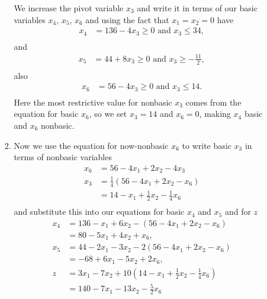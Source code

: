 \documentclass[10pt]{article}
\begin{document}
\begin{enumerate}
\begin{enumerate}
\begin{enumerate}
          We increase the pivot variable $x_3$ and write it in terms of our
          basic variables $x_4$, $x_5$, $x_6$ and using the fact that $x_1 =
          x_2 = 0$ have
          \begin{align*}
            x_4  &=  136  -  4x_3 \geq 0 \text{ and } x_3 \leq 34, \\
          \end{align*}
          and
          \begin{align*}
            x_5  &=  44  +  8x_3 \geq 0 \text{ and } x_3 \geq - \frac{11}{2}, \\
          \end{align*}
          also
          \begin{align*}
            x_6  &=  56  -  4x_3 \geq 0 \text{ and } x_3 \leq 14. \\
          \end{align*}
          Here the most restrictive value for nonbasic $x_3$ comes from the
          equation for basic $x_6$, so we set $x_3 = 14$ and $x_6 = 0$, making
          $x_4$ basic and $x_6$ nonbasic.
        \pagebreak
        \item
          Now we use the equation for now-nonbasic $x_6$ to write basic $x_3$
          in terms of nonbasic variables
          \begin{align*}
            x_6  &=  56  -  4x_1  +  2x_2  -  4x_3 \\
            x_3  &=  \frac{1}{4}\left(56  -  4x_1  +  2x_2  -  x_6\right) \\
                 &=  14  -  x_1  +  \frac{1}{2}x_2  -  \frac{1}{4}x_6 \\
          \end{align*}
          and substitute this into our equations for basic $x_4$ and $x_5$ and
          for $z$
          \begin{align*}
            x_4  &=  136  -  x_1  +  6x_2  -  (56  -  4x_1  +  2x_2  -  x_6) \\
                 &=  80  -  5x_1  +  4x_2  +  x_6,  \\
            x_5  &=  44  -  2x_1  -  3x_2  -  2(56  -  4x_1  +  2x_2  -  x_6) \\
                 &=  -68  +  6x_1  -  5x_2  +  2x_6, \\
            z  &=  3x_1 - 7x_2 + 10(14  -  x_1  +  \frac{1}{2}x_2  -  \frac{1}{4}x_6) \\
               &=  140 - 7x_1 - 13x_2 - \frac{5}{2}x_6
          \end{align*}

\end{enumerate}
\end{enumerate}
\end{enumerate}
\end{document}
